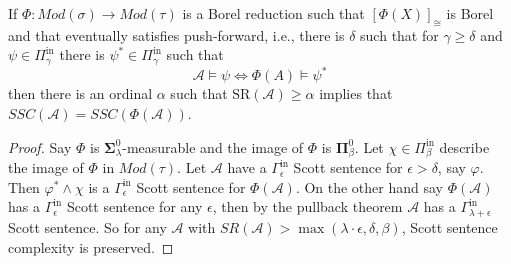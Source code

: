 \documentclass[10pt,a4paper]{amsart}
\renewcommand{\phi}{\varphi}
\providecommand{\A}{\mathcal{A}}
\providecommand{\bSigma}{\bm\Sigma}
\providecommand{\bPi}{\bm\Pi}
\providecommand{\Pinf}[1]{\Pi^{\mathrm{in}}_{#1}}
\newcommand{\SR}{SR}
\begin{document}
\begin{proposition}\label{prop:push-forwardssc}
   If $\Phi:Mod(\sigma)\to Mod(\tau)$ is a Borel reduction such that
   $[\Phi(X)]_{\cong}$ is Borel and that eventually satisfies push-forward, i.e.,
   there is $\delta$ such that for $\gamma\geq\delta$ and
   $\psi\in\Pinf{\gamma}$ there is $\psi^*\in\Pinf{\gamma}$ such that
   $$\A\models \psi \iff \Phi(A)\models\psi^*$$
   then there is an ordinal $\alpha$ such that $\text{SR}(\A)\geq\alpha$ implies
   that $SSC(\A)=SSC(\Phi(\A))$.
\end{proposition}

\begin{proof}
Say $\Phi$ is $\bSigma_\lambda^0$-measurable and the image of $\Phi$ is
$\bPi_\beta^0$. Let $\chi\in\Pinf{\beta}$ describe the image of $\Phi$ in
$Mod(\tau)$. 
Let $\A$ have a $\Gamma^{\mathrm{in}}_\epsilon$ Scott sentence for
$\epsilon>\delta$, say $\phi$. Then $\phi^*\land \chi$ is a
$\Gamma^\mathrm{in}_\epsilon$ Scott sentence for $\Phi(\A)$. On the other hand
say $\Phi(\A)$ has a $\Gamma^{\mathrm{in}}_\epsilon$ Scott sentence for any
$\epsilon$, then by the pullback theorem $\A$ has a
$\Gamma^{\mathrm{in}}_{\lambda+\epsilon}$ Scott sentence. So for any $\A$ with
$\SR(\A)>\max(\lambda\cdot \epsilon, \delta,\beta)$, Scott sentence complexity
is preserved.
\end{proof}
\end{document}
